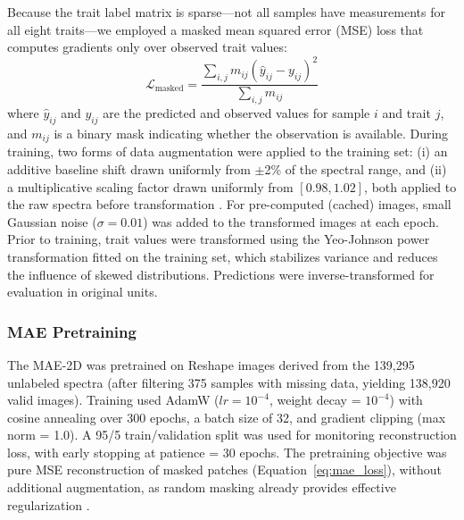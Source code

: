 Because the trait label matrix is sparse---not all samples have measurements for all eight traits---we employed a masked mean squared error (MSE) loss that computes gradients only over observed trait values:
\begin{equation}
    \mathcal{L}_\text{masked} = \frac{\sum_{i,j} m_{ij}(\hat{y}_{ij} - y_{ij})^2}{\sum_{i,j} m_{ij}}
    \label{eq:masked_mse}
\end{equation}
where $\hat{y}_{ij}$ and $y_{ij}$ are the predicted and observed values for sample $i$ and trait $j$, and $m_{ij}$ is a binary mask indicating whether the observation is available. During training, two forms of data augmentation were applied to the training set: (i) an additive baseline shift drawn uniformly from $\pm$2\% of the spectral range, and (ii) a multiplicative scaling factor drawn uniformly from $[0.98, 1.02]$, both applied to the raw spectra before transformation . For pre-computed (cached) images, small Gaussian noise ($\sigma = 0.01$) was added to the transformed images at each epoch. Prior to training, trait values were transformed using the Yeo-Johnson power transformation \citep{yeo2000power} fitted on the training set, which stabilizes variance and reduces the influence of skewed distributions. Predictions were inverse-transformed for evaluation in original units.

\subsubsection{MAE Pretraining}

The MAE-2D was pretrained on Reshape images derived from the 139,295 unlabeled spectra (after filtering 375 samples with missing data, yielding 138,920 valid images). Training used AdamW ($lr = 10^{-4}$, weight decay = $10^{-4}$) with cosine annealing over 300 epochs, a batch size of 32, and gradient clipping (max norm = 1.0). A 95/5 train/validation split was used for monitoring reconstruction loss, with early stopping at patience = 30 epochs. The pretraining objective was pure MSE reconstruction of masked patches (Equation~\ref{eq:mae_loss}), without additional augmentation, as random masking already provides effective regularization \citep{he2022mae}.

